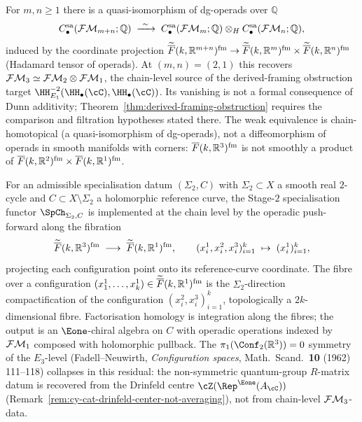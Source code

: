 \begin{proposition}
\label{prop:cy-cat-fm-dunn}
For $m, n \geq 1$ there is a quasi-isomorphism of dg-operads over
$\mathbb{Q}$
\[
 C^{\mathrm{sa}}_\bullet(\mathcal{FM}_{m+n}; \mathbb{Q})
 \;\xrightarrow{\ \sim\ }\;
 C^{\mathrm{sa}}_\bullet(\mathcal{FM}_m; \mathbb{Q})
 \otimes_H
 C^{\mathrm{sa}}_\bullet(\mathcal{FM}_n; \mathbb{Q}),
\]
induced by the coordinate projection
$\widetilde{\overline{F}}(k, \mathbb{R}^{m+n})^{\mathrm{fm}} \to
 \widetilde{\overline{F}}(k, \mathbb{R}^m)^{\mathrm{fm}} \times
 \widetilde{\overline{F}}(k, \mathbb{R}^n)^{\mathrm{fm}}$
(Hadamard tensor of operads). At $(m, n) = (2, 1)$ this recovers
$\mathcal{FM}_3 \simeq \mathcal{FM}_2 \otimes \mathcal{FM}_1$, the chain-level source of the
derived-framing obstruction target
$\HH^{-2}_{E_1}(\HH_\bullet(\cC), \HH_\bullet(\cC))$. Its vanishing is
not a formal consequence of Dunn additivity; Theorem~\ref{thm:derived-framing-obstruction}
requires the comparison and filtration hypotheses stated there. The weak equivalence
is chain-homotopical (a quasi-isomorphism of dg-operads), not a
diffeomorphism of operads in smooth manifolds with corners:
$\overline{F}(k, \mathbb{R}^3)^{\mathrm{fm}}$ is not smoothly a product of
$\overline{F}(k, \mathbb{R}^2)^{\mathrm{fm}} \times \overline{F}(k, \mathbb{R}^1)^{\mathrm{fm}}$.
\end{proposition}

\begin{proposition}
\label{prop:cy-cat-fm3-to-fm1}
For an admissible specialisation datum $(\Sigma_2, C)$ with
$\Sigma_2 \subset X$ a smooth real $2$-cycle and $C \subset
X \setminus \Sigma_2$ a holomorphic reference curve, the Stage-$2$
specialisation functor $\SpCh_{\Sigma_2, C}$ is implemented at the
chain level by the operadic push-forward along the fibration
\[
 \widetilde{\overline{F}}(k, \mathbb{R}^3)^{\mathrm{fm}}
 \;\longrightarrow\;
 \widetilde{\overline{F}}(k, \mathbb{R}^1)^{\mathrm{fm}},
 \qquad
 (x_i^1, x_i^2, x_i^3)_{i=1}^{k}
 \;\mapsto\; (x_i^1)_{i=1}^{k},
\]
projecting each configuration point onto its reference-curve coordinate.
The fibre over a configuration $(x_1^1, \ldots, x_k^1) \in
\widetilde{\overline{F}}(k, \mathbb{R}^1)^{\mathrm{fm}}$ is the $\Sigma_2$-direction
compactification of the configuration $(x_i^2, x_i^3)_{i=1}^{k}$,
topologically a $2k$-dimensional fibre. Factorisation homology is
integration along the fibres; the output is an $\Eone$-chiral algebra
on $C$ with operadic operations indexed by $\mathcal{FM}_1$ composed with
holomorphic pullback. The $\pi_1(\Conf_2(\mathbb{R}^3)) = 0$ symmetry
of the $E_3$-level
(Fadell--Neuwirth, \emph{Configuration spaces}, Math.\ Scand.\ \textbf{10} (1962) 111--118) collapses in this
residual: the non-symmetric quantum-group $R$-matrix datum is
recovered from the Drinfeld centre $\cZ(\Rep^{\Eone}(A_\cC))$
(Remark~\ref{rem:cy-cat-drinfeld-center-not-averaging}), not from
chain-level $\mathcal{FM}_3$-data.
\end{proposition}

